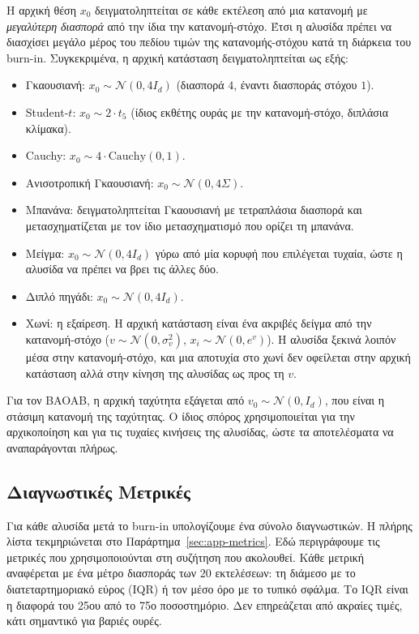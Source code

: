 Η αρχική θέση $x_0$ δειγματοληπτείται σε κάθε εκτέλεση από μια κατανομή με
\emph{μεγαλύτερη διασπορά} από την ίδια την κατανομή-στόχο. Έτσι η αλυσίδα
πρέπει να διασχίσει μεγάλο μέρος του πεδίου τιμών
της κατανομής-στόχου κατά τη διάρκεια του burn-in. Συγκεκριμένα, η αρχική
κατάσταση δειγματοληπτείται ως εξής:

\begin{itemize}
  \item Γκαουσιανή: $x_0 \sim \mathcal{N}(0, 4 I_d)$ (διασπορά $4$, έναντι
        διασποράς στόχου $1$).
  \item Student-$t$: $x_0 \sim 2 \cdot t_5$ (ίδιος εκθέτης ουράς με την κατανομή-στόχο, διπλάσια κλίμακα).
  \item Cauchy: $x_0 \sim 4 \cdot \mathrm{Cauchy}(0, 1)$.
  \item Ανισοτροπική Γκαουσιανή: $x_0 \sim \mathcal{N}(0, 4\Sigma)$.
  \item Μπανάνα: δειγματοληπτείται Γκαουσιανή με τετραπλάσια διασπορά και
        μετασχηματίζεται με τον ίδιο μετασχηματισμό που ορίζει τη μπανάνα.
  \item Μείγμα: $x_0 \sim \mathcal{N}(0, 4 I_d)$ γύρω από μία κορυφή που
        επιλέγεται τυχαία, ώστε η αλυσίδα να πρέπει να βρει τις άλλες δύο.
  \item Διπλό πηγάδι: $x_0 \sim \mathcal{N}(0, 4 I_d)$.
  \item Χωνί: η εξαίρεση. Η αρχική κατάσταση είναι ένα ακριβές δείγμα από την
        κατανομή-στόχο ($v \sim \mathcal{N}(0, \sigma_v^2)$,
        $x_i \sim \mathcal{N}(0, e^{v})$). Η αλυσίδα ξεκινά λοιπόν μέσα στην
        κατανομή-στόχο, και μια αποτυχία στο χωνί δεν οφείλεται στην αρχική
        κατάσταση αλλά στην κίνηση της αλυσίδας ως προς τη $v$.
\end{itemize}

Για τον BAOAB, η αρχική ταχύτητα εξάγεται από $v_0 \sim \mathcal{N}(0, I_d)$,
που είναι η στάσιμη κατανομή της ταχύτητας. Ο ίδιος σπόρος χρησιμοποιείται για την αρχικοποίηση και για τις
τυχαίες κινήσεις της αλυσίδας, ώστε τα αποτελέσματα να αναπαράγονται πλήρως.

\subsection{Διαγνωστικές Μετρικές}
\label{sec:diagnostics}

Για κάθε αλυσίδα μετά το burn-in υπολογίζουμε ένα σύνολο διαγνωστικών. Η
πλήρης λίστα τεκμηριώνεται στο Παράρτημα~\ref{sec:app-metrics}. Εδώ
περιγράφουμε τις μετρικές που χρησιμοποιούνται στη συζήτηση που ακολουθεί.
Κάθε μετρική αναφέρεται με ένα μέτρο διασποράς των $20$ εκτελέσεων:
τη διάμεσο με το διατεταρτημοριακό εύρος (IQR) ή τον μέσο όρο με το τυπικό σφάλμα.
Το IQR είναι η διαφορά του 25ου από το 75ο ποσοστημόριο. Δεν επηρεάζεται από ακραίες
τιμές, κάτι σημαντικό για βαριές ουρές.


